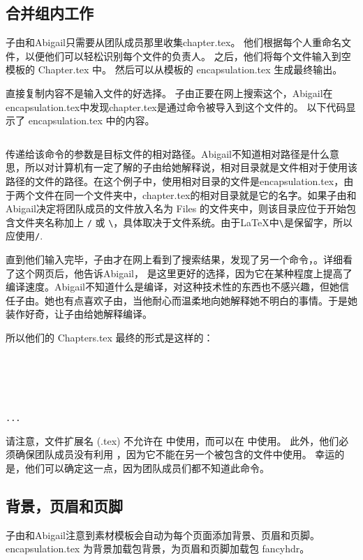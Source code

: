 \subsection{合并组内工作}
子由和Abigail只需要从团队成员那里收集chapter.tex。 他们根据每个人重命名文件，以便他们可以轻松识别每个文件的负责人。 之后，他们将每个文件输入到空模板的 Chapter.tex 中。 然后可以从模板的 encapsulation.tex 生成最终输出。

直接复制内容不是输入文件的好选择。 子由正要在网上搜索这个，Abigail在encapsulation.tex中发现chapter.tex是通过命令\verb==被导入到这个文件的。 以下代码显示了 encapsulation.tex 中的内容。 
\begin{lstlisting}

\end{lstlisting}
传递给该命令的参数是目标文件的相对路径。Abigail不知道相对路径是什么意思，所以对计算机有一定了解的子由给她解释说，相对目录就是文件相对于使用该路径的文件的路径。在这个例子中，使用相对目录的文件是encapsulation.tex，由于两个文件在同一个文件夹中，chapter.tex的相对目录就是它的名字。如果子由和Abigail决定将团队成员的文件放入名为 Files 的文件夹中，则该目录应位于开始包含文件夹名称加上 \verb=/= 或 \verb=\=，具体取决于文件系统。由于\LaTeX{}中\verb=\=是保留字，所以应使用\verb=/=.

直到他们输入完毕，子由才在网上看到了搜索结果，发现了另一个命令，\verb==。详细看了这个网页后，他告诉Abigail，\verb== 是这里更好的选择，因为它在某种程度上提高了编译速度。Abigail不知道什么是编译，对这种技术性的东西也不感兴趣，但她信任子由。她也有点喜欢子由，当他耐心而温柔地向她解释她不明白的事情。于是她装作好奇，让子由给她解释编译。

所以他们的 Chapters.tex 最终的形式是这样的：
\begin{lstlisting}





...
\end{lstlisting}
请注意，文件扩展名 (.tex) 不允许在 \verb== 中使用，而可以在 \verb== 中使用。 此外，他们必须确保团队成员没有利用 \verb==，因为它不能在另一个被\verb==包含的文件中使用。 幸运的是，他们可以确定这一点，因为团队成员们都不知道此命令。

\subsection{背景，页眉和页脚}
子由和Abigail注意到素材模板会自动为每个页面添加背景、页眉和页脚。 encapsulation.tex 为背景加载包背景，为页眉和页脚加载包 fancyhdr。

